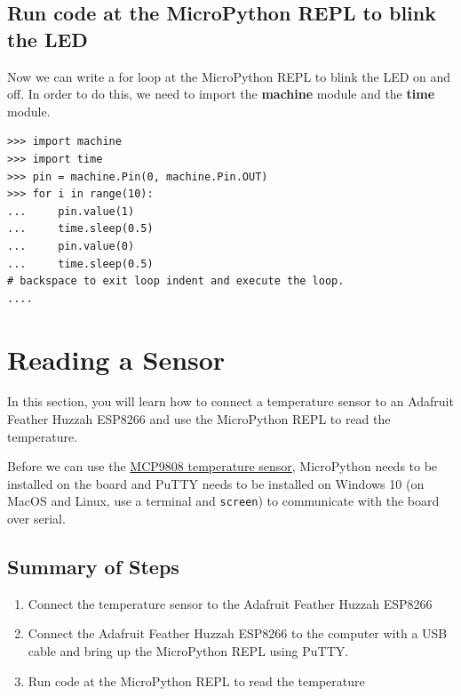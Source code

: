 \documentclass{book}
\providecommand{\tightlist}{%
      \setlength{\itemsep}{0pt}\setlength{\parskip}{0pt}}
\begin{document}
    
        \subsection{Run code at the MicroPython REPL to blink the
LED}\label{run-code-at-the-micropython-repl-to-blink-the-led}
    




    
        Now we can write a for loop at the MicroPython REPL to blink the LED on
and off. In order to do this, we need to import the \textbf{machine}
module and the \textbf{time} module.
    




    
        \begin{lstlisting}
>>> import machine
>>> import time
>>> pin = machine.Pin(0, machine.Pin.OUT)
>>> for i in range(10):
...     pin.value(1)
...     time.sleep(0.5)
...     pin.value(0)
...     time.sleep(0.5)
# backspace to exit loop indent and execute the loop.
.... 
\end{lstlisting}
    




    
        \section{Reading a Sensor}\label{reading-a-sensor}
    




    
        In this section, you will learn how to connect a temperature sensor to
an Adafruit Feather Huzzah ESP8266 and use the MicroPython REPL to read
the temperature.

Before we can use the
\href{https://www.adafruit.com/product/1782}{MCP9808 temperature
sensor}, MicroPython needs to be installed on the board and PuTTY needs
to be installed on Windows 10 (on MacOS and Linux, use a terminal and
\lstinline!screen!) to communicate with the board over serial.
    




    
        \subsection{Summary of Steps}\label{summary-of-steps}
    




    
        \begin{enumerate}
\def\labelenumi{\arabic{enumi}.}
\tightlist
\item
  Connect the temperature sensor to the Adafruit Feather Huzzah ESP8266
\item
  Connect the Adafruit Feather Huzzah ESP8266 to the computer with a USB
  cable and bring up the MicroPython REPL using PuTTY.
\item
  Run code at the MicroPython REPL to read the temperature
\end{enumerate}
    
\end{document}
